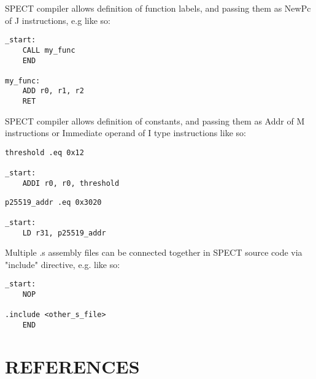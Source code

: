 \documentclass{tropic_design_spec}
\begin{document}


SPECT compiler allows definition of function labels, and passing them
as NewPc of J instructions, e.g like so:

\begin{lstlisting}
_start:
    CALL my_func
    END

my_func:
    ADD r0, r1, r2
    RET
\end{lstlisting}


SPECT compiler allows definition of constants, and passing them as
Addr of M instructions or Immediate operand of I type instructions like so:

\begin{lstlisting}
threshold .eq 0x12

_start:
    ADDI r0, r0, threshold
\end{lstlisting}

\begin{lstlisting}
p25519_addr .eq 0x3020

_start:
    LD r31, p25519_addr
\end{lstlisting}



Multiple .s assembly files can be connected together in SPECT source code
via "include" directive, e.g. like so:

\begin{lstlisting}
_start:
    NOP

.include <other_s_file>
    END
\end{lstlisting}

\section{REFERENCES}\label{s:REFERENCES}

\begin{thebibliography}{99}


\end{thebibliography}



\PrintOpenIssueSummary
\end{document}
